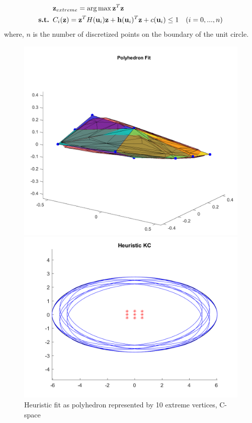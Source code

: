 \documentclass{article}
\begin{document}
\begin{enumerate}
\begin{enumerate}
\begin{equation}
\begin{aligned}
& {\bf z}_{extreme} = \arg\max {\bf z}^T {\bf z} \\
\text{{\bf s.t.   }} & C_i({\bf z}) = {\bf z}^T H({\bf u}_i) {\bf z} + {\bf h}({\bf u}_i)^T {\bf z} + c({\bf u}_i) \leq 1 & (i=0,...,n)\\
\end{aligned}
\end{equation}
where, $n$ is the number of discretized points on the boundary of the unit circle.

\begin{figure}[!b]
\centering
\begin{minipage}[b]{0.4\textwidth}
	\includegraphics[scale = 0.2]{c-space-polyhedron-fit.png}
	\caption{Heuristic fit as polyhedron represented by 10 extreme vertices, C-space}
	\label{polyfit_cspace}
\end{minipage}
\hfill
\begin{minipage}[b]{0.4\textwidth}
	\includegraphics[scale = 0.25]{ellipses-polyhedron-fit.png}

\end{minipage}
\end{figure}
\end{enumerate}
\end{enumerate}
\end{document}
